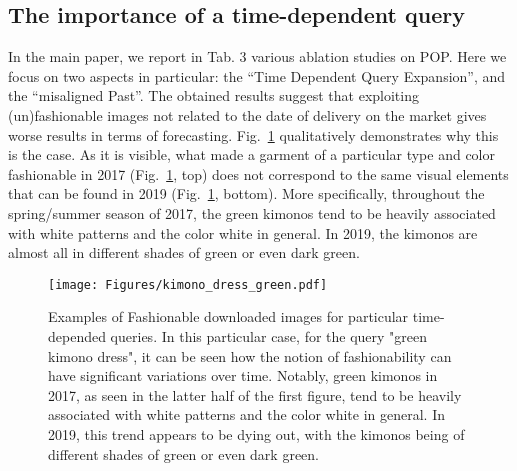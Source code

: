 \documentclass[runningheads]{llncs}
\begin{document}
\subsection{The importance of a time-dependent query}
In the main paper, we report in Tab. 3 various ablation studies on POP. Here we focus on two aspects in particular: the ``Time Dependent Query Expansion'', and the ``misaligned Past''. The obtained results suggest that exploiting (un)fashionable images not related to the date of delivery on the market gives worse results in terms of forecasting. Fig.~\ref{fig:kimono} qualitatively demonstrates why this is the case. As it is visible, what made a garment of a particular type and color fashionable in 2017 (Fig.~\ref{fig:kimono}, top) does not correspond to the same visual elements that can be found in 2019 (Fig.~\ref{fig:kimono}, bottom). More specifically, throughout the spring/summer season of 2017, the green kimonos tend to be heavily associated with white patterns and the color white in general. In 2019, the kimonos are almost all in different shades of green or even dark green.
\begin{figure}[]
    \begin{center}
        \texttt{[image: Figures/kimono\_dress\_green.pdf]}
    \end{center}
    \caption{Examples of Fashionable downloaded images for particular time-depended queries. In this particular case, for the query "green kimono dress", it can be seen how the notion of fashionability can have significant variations over time. Notably, green kimonos in 2017, as seen in the latter half of the first figure, tend to be heavily associated with white patterns and the color white in general. In 2019, this trend appears to be dying out, with the kimonos being of different shades of green or even dark green.}
    \label{fig:kimono} 
\end{figure}
\end{document}
